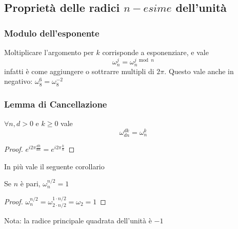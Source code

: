 \subsection{Proprietà delle radici $n-esime$ dell'unità}

\subsubsection{Modulo dell'esponente}

Moltiplicare l'argomento per $k$ corrisponde a esponenziare, e vale
\begin{equation*}
    \omega_n^j = \omega_n^{j \bmod n}
\end{equation*}
infatti è come aggiungere o sottrarre multipli di $2\pi$. Questo vale anche in negativo: $\omega_8^{6} = \omega_8^{-2} $

\subsubsection{Lemma di Cancellazione}
\begin{lemma}
    $\forall n, d > 0$ e $k \geq 0$ vale 
    \begin{equation*}
        \omega_{dn}^{dk} = \omega_n^k
    \end{equation*}
    \label{teo:cancellazione}
\end{lemma}
\begin{proof}
    $e^{i 2 \pi \frac{dk}{dn}} = e^{i 2 \pi \frac{k}{n}}$
\end{proof}
In più vale il seguente corollario
\begin{lemma}
    Se $n$ è pari, $ \omega_{n}^{n/2} =1 $
\end{lemma}
\begin{proof}
    $ \omega_{n}^{n/2} =
    \omega_{2 \cdot n/2}^{1 \cdot n/2} =
    \omega_{2} = 1 $
\end{proof}
Nota: la radice principale quadrata dell'unità è $-1$

